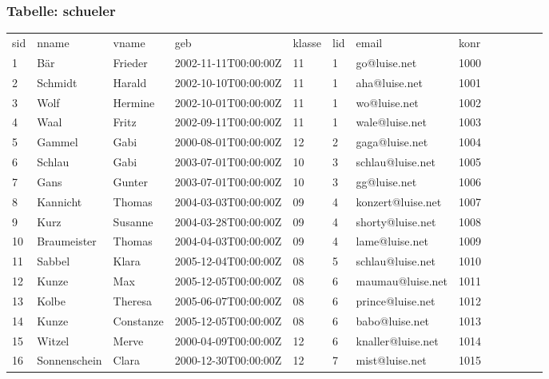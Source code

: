 \documentclass[fleqn]{scrartcl}
\begin{document}
\subsubsection{Tabelle: schueler}
\begin{tabular}{|l|l|l|l|l|l|l|l|l|l|l|l|l|}\toprule
\rowcolor{green!20}
\multicolumn{8}{|c|}{
schueler
}\\\midrule
\rowcolor{yellow!30}sid & nname  & vname  & geb  & klasse  & lid  & email  & konr  \\\midrule
1& Bär & Frieder & 2002-11-11T00:00:00Z & 11 & 1 & go@luise.net & 1000  \\ 
2& Schmidt & Harald & 2002-10-10T00:00:00Z & 11 & 1 & aha@luise.net & 1001  \\ 
3& Wolf & Hermine & 2002-10-01T00:00:00Z & 11 & 1 & wo@luise.net & 1002  \\ 
4& Waal & Fritz & 2002-09-11T00:00:00Z & 11 & 1 & wale@luise.net & 1003  \\ 
5& Gammel & Gabi & 2000-08-01T00:00:00Z & 12 & 2 & gaga@luise.net & 1004  \\ 
6& Schlau & Gabi & 2003-07-01T00:00:00Z & 10 & 3 & schlau@luise.net & 1005  \\ 
7& Gans & Gunter & 2003-07-01T00:00:00Z & 10 & 3 & gg@luise.net & 1006  \\ 
8& Kannicht & Thomas & 2004-03-03T00:00:00Z & 09 & 4 & konzert@luise.net & 1007  \\ 
9& Kurz & Susanne & 2004-03-28T00:00:00Z & 09 & 4 & shorty@luise.net & 1008  \\ 
10& Braumeister & Thomas & 2004-04-03T00:00:00Z & 09 & 4 & lame@luise.net & 1009  \\ 
11& Sabbel & Klara & 2005-12-04T00:00:00Z & 08 & 5 & schlau@luise.net & 1010  \\ 
12& Kunze & Max & 2005-12-05T00:00:00Z & 08 & 6 & maumau@luise.net & 1011  \\ 
13& Kolbe & Theresa & 2005-06-07T00:00:00Z & 08 & 6 & prince@luise.net & 1012  \\ 
14& Kunze & Constanze & 2005-12-05T00:00:00Z & 08 & 6 & babo@luise.net & 1013  \\ 
15& Witzel & Merve & 2000-04-09T00:00:00Z & 12 & 6 & knaller@luise.net & 1014  \\ 
16& Sonnenschein & Clara & 2000-12-30T00:00:00Z & 12 & 7 & mist@luise.net & 1015  \\ 
\bottomrule
\end{tabular}
\end{document}
